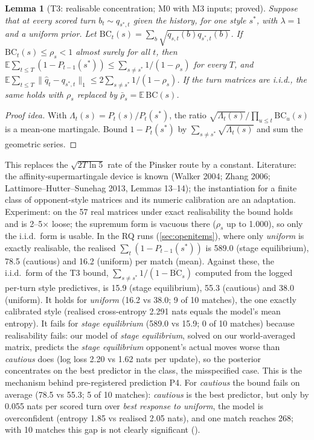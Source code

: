 \documentclass[10pt]{article}
\theoremstyle{plain}
\newtheorem{lemma}[theorem]{Lemma}
\theoremstyle{definition}
\theoremstyle{remark}
\newcommand{\E}{\mathbb{E}}
\newcommand{\qhat}{\hat q}
\newcommand{\src}[1]{\path{#1}}
\begin{document}
\begin{lemma}[T3: realisable concentration; M0 with M3 inputs; proved]\label{lem:T3}
Suppose that at every scored turn $b_t\sim q_{s^*,t}$ given the history, for one style $s^*$, with $\lambda=1$ and a
uniform prior. Let $\mathrm{BC}_t(s)=\sum_b\sqrt{q_{s,t}(b)q_{s^*,t}(b)}$. If $\mathrm{BC}_t(s)\le\rho_s<1$ almost surely for all
$t$, then $\E\sum_{t\le T}(1-P_{t-1}(s^*))\le\sum_{s\ne s^*}1/(1-\rho_s)$ for every $T$, and
$\E\sum_{t\le T}\|\qhat_t-q_{s^*,t}\|_1\le2\sum_{s\ne s^*}1/(1-\rho_s)$. If the turn matrices are i.i.d., the same holds with
$\rho_s$ replaced by $\bar\rho_s=\E\,\mathrm{BC}(s)$.
\end{lemma}
\begin{proof}[Proof idea] With $\Lambda_t(s)=P_t(s)/P_t(s^*)$, the ratio $\sqrt{\Lambda_t(s)}/\prod_{u\le t}\mathrm{BC}_u(s)$ is a
mean-one martingale. Bound $1-P_t(s^*)$ by $\sum_{s\ne s^*}\sqrt{\Lambda_t(s)}$ and sum the geometric series. \end{proof}
This replaces the $\sqrt{2T\ln5}$ rate of the Pinsker route by a constant. Literature: the affinity-supermartingale
device is known (Walker 2004; Zhang 2006; Lattimore--Hutter--Sunehag 2013, Lemmas 13--14); the instantiation for a
finite class of opponent-style matrices and its numeric calibration are an adaptation. Experiment: on the 57 real
matrices under exact realisability the bound holds and is 2--5$\times$ loose; the supremum form is vacuous there
($\rho_s$ up to 1.000), so only the i.i.d.\ form is usable. In the RQ runs (\cref{sec:openitems}), where only
\emph{uniform} is exactly realisable, the realised $\sum_t(1-P_{t-1}(s^*))$ is 589.0 (stage equilibrium), 78.5 (cautious) and 16.2 (uniform)
per match (mean).
Against these, the i.i.d.\ form of the T3 bound, $\sum_{s\ne s^*}1/(1-\overline{\mathrm{BC}}_s)$ computed from the logged
per-turn style predictives, is 15.9 (stage equilibrium), 55.3 (cautious) and 38.0 (uniform). It holds for \emph{uniform} (16.2 vs 38.0; 9 of 10
matches), the one exactly calibrated style (realised cross-entropy 2.291 nats equals the model's mean entropy). It fails for
\emph{stage equilibrium} (589.0 vs 15.9; 0 of 10 matches) because realisability fails: our model of \emph{stage equilibrium}, solved on our world-averaged
matrix, predicts the \emph{stage equilibrium} opponent's actual moves worse than \emph{cautious} does (log loss 2.20 vs 1.62 nats per update),
so the posterior concentrates on the best predictor in the class, the misspecified case. This is the mechanism behind
pre-registered prediction P4. For \emph{cautious} the bound fails on average (78.5 vs 55.3; 5 of 10 matches): \emph{cautious} is the
best predictor, but only by 0.055 nats per scored turn over \emph{best response to uniform}, the model is overconfident (entropy 1.85
vs realised 2.05 nats), and one match reaches 268; with 10 matches this gap is not clearly significant
(\src{engine/analysis/open_items/t3/T3\_RQ.md}).
\end{document}
